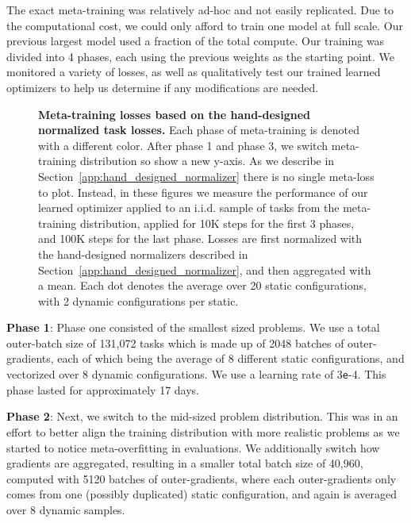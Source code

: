 \documentclass[11pt]{article}
\newcommand{\e}{\texttt{e}}
\begin{document}
The exact meta-training was relatively ad-hoc and not easily replicated.
Due to the computational cost, we could only afford to train one model at full scale.
Our previous largest model used a fraction of the total compute.
Our training was divided into 4 phases, each using the previous weights as the starting point.
We monitored a variety of losses, as well as qualitatively test our trained learned optimizers to help us determine if any modifications are needed. 


\begin{figure}[t!]
    \centering
    \caption{\textbf{Meta-training losses based on the hand-designed normalized task losses.} Each phase of meta-training is denoted with a different color. After phase 1 and phase 3, we switch meta-training distribution so show a new y-axis. As we describe in Section~\ref{app:hand_designed_normalizer} there is no single meta-loss to plot. Instead, in these figures we measure the performance of our learned optimizer applied to an i.i.d. sample of tasks from the meta-training distribution, applied for 10K steps for the first 3 phases, and 100K steps for the last phase. Losses are first normalized with the hand-designed normalizers described in Section~\ref{app:hand_designed_normalizer}, and then aggregated with a mean. Each dot denotes the average over 20 static configurations, with 2 dynamic configurations per static.
    \label{fig:meta_training_curve_loss}
    }
\end{figure}

\textbf{Phase 1}: Phase one consisted of the smallest sized problems. We use a total outer-batch size of 131,072 tasks which is made up of 2048 batches of outer-gradients, each of which being the average of 8 different static configurations, and vectorized over 8 dynamic configurations. We use a learning rate of 3\e-4.
This phase lasted for approximately 17 days.

\textbf{Phase 2}: Next, we switch to the mid-sized problem distribution. This was in an effort to better align the training distribution with more realistic problems as we started to notice meta-overfitting in evaluations. We additionally switch how gradients are aggregated, resulting in a smaller total batch size of 40,960, computed with 5120 batches of outer-gradients, where each outer-gradients only comes from one (possibly duplicated) static configuration, and again is averaged over 8 dynamic samples.
\end{document}
